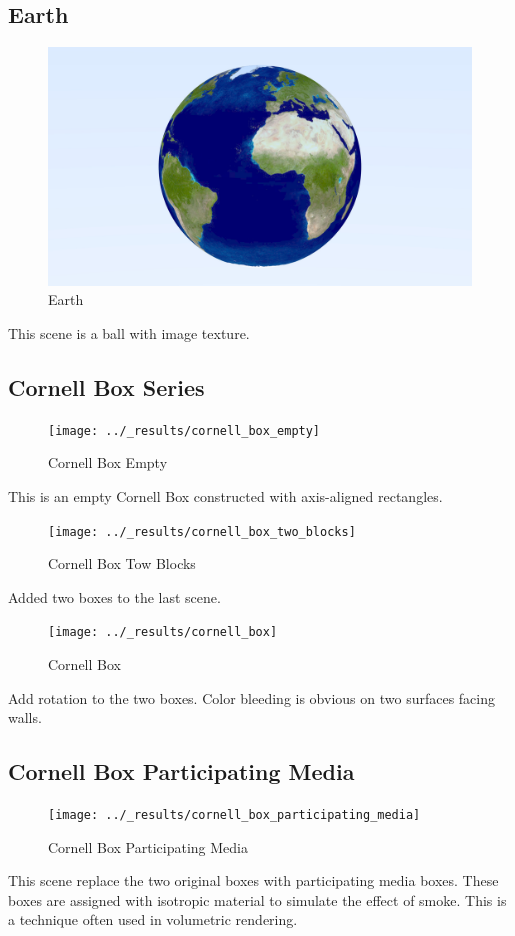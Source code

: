 \documentclass[utf8]{article}
\begin{document}
\subsection{Earth}
\begin{figure}[H]
	\centering
	\includegraphics[width=0.7\linewidth]{../_results/earth}
	\caption{Earth}
	\label{fig:earth}
\end{figure}
This scene is a ball with image texture.

\subsection{Cornell Box Series}
\begin{figure}[H]
	\centering
	\texttt{[image: ../\_results/cornell\_box\_empty]}
	\caption{Cornell Box Empty}
	\label{fig:cornellboxempty}
\end{figure}
This is an empty Cornell Box constructed with axis-aligned rectangles.

\begin{figure}[H]
	\centering
	\texttt{[image: ../\_results/cornell\_box\_two\_blocks]}
	\caption{Cornell Box Tow Blocks}
	\label{fig:cornellboxtwoblocks}
\end{figure}
\noindent
Added two boxes to the last scene.

\begin{figure}[H]
	\centering
	\texttt{[image: ../\_results/cornell\_box]}
	\caption{Cornell Box}
	\label{fig:cornellbox}
\end{figure}
\noindent
Add rotation to the two boxes. Color bleeding is obvious on two surfaces facing walls.

\subsection{Cornell Box Participating Media}
\begin{figure}[H]
	\centering
	\texttt{[image: ../\_results/cornell\_box\_participating\_media]}
	\caption{Cornell Box Participating Media}
	\label{fig:cornellboxparticipatingmedia}
\end{figure}
This scene replace the two original boxes with participating media boxes. These boxes are assigned with isotropic material to simulate the effect of smoke. This is a technique often used in volumetric rendering. 
\end{document}

